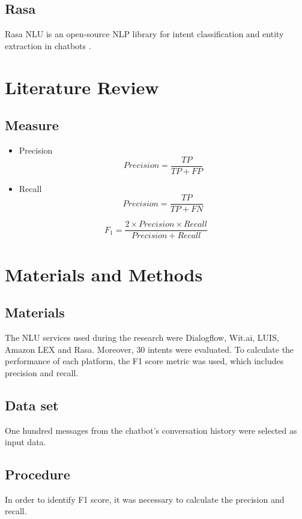 \documentclass[conference]{IEEEtran}
\begin{document}
\subsection{Rasa}
Rasa NLU is an open-source NLP library for intent classification and entity extraction in chatbots \cite{raj2018building}.

\section{Literature Review}
\subsection{Measure}
\begin{itemize}
    \item Precision
          \begin{equation}
              Precision=\frac{TP}{TP+FP}\label{eq}
          \end{equation}
    \item Recall
          \begin{equation}
              Precision=\frac{TP}{TP+FN}\label{eq}
          \end{equation}
\end{itemize}

\begin{equation}
    F_{1} =\frac{2 \times Precision\times Recall}{Precision+Recall}\label{eq}
\end{equation}

\section{Materials and Methods}
\subsection{Materials}
The NLU services used during the research were Dialogflow, Wit.ai, LUIS, Amazon LEX and Rasa. Moreover, 30 intents were evaluated. To calculate the performance of each platform, the F1 score metric was used, which includes precision and recall.

\subsection{Data set}
One hundred messages from the chatbot's conversation history were selected as input data.

\subsection{Procedure}
In order to identify F1 score, it was necessary to calculate the precision and recall.
\end{document}
